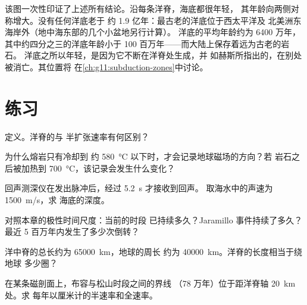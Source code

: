 该图一次性印证了上述所有结论。沿每条洋脊，海底都很年轻，
其年龄向两侧对称增大。没有任何洋底老于
约 1.9 亿年：最古老的洋底位于西太平洋及
北美洲东海岸外（地中海东部的几个小盆地另行计算）。
洋底的平均年龄约为
6400 万年，其中约四分之三的洋底年龄小于 100
百万年——而大陆上保存着远为古老的岩石。
洋底之所以年轻，是因为它不断在洋脊处生成，并
如赫斯所指出的，在别处被消亡。其位置将
在\cref{ch:g11:subduction-zones}中讨论。

\section{练习}

\begin{exercise}[$\star$]\label{exo:g11:drift-to-spreading:1}
定义。洋脊的与
半扩张速率有何区别？
\end{exercise}

\begin{exercise}[$\star$]\label{exo:g11:drift-to-spreading:2}
为什么熔岩只有冷却到
约 \qty{580}{\celsius} 以下时，才会记录地球磁场的方向？若
岩石之后被加热到 \qty{700}{\celsius}，该记录会发生什么变化？
\end{exercise}

\begin{exercise}[$\star$]\label{exo:g11:drift-to-spreading:3}
回声测深仪在发出脉冲后，经过 \qty{5.2}{s} 才接收到回声。
取海水中的声速为 \qty{1500}{m/s}，求
海底的深度。
\end{exercise}

\begin{exercise}[$\star$]\label{exo:g11:drift-to-spreading:4}
对照本章的极性时间尺度：当前的时段
已持续多久？Jaramillo 事件持续了多久？
最近 5 百万年内发生了多少次倒转？
\end{exercise}

\begin{exercise}[$\star$]\label{exo:g11:drift-to-spreading:5}
洋中脊的总长约为 \qty{65000}{km}，地球的周长
约为 \qty{40000}{km}。洋脊的长度相当于绕地球
多少圈？
\end{exercise}

\begin{exercise}[$\star\star$]\label{exo:g11:drift-to-spreading:6}
在某条磁剖面上，布容与松山时段之间的界线
（78 万年）位于距洋脊轴 \qty{20}{km} 处。求
每年以厘米计的半速率和全速率。
\end{exercise}

